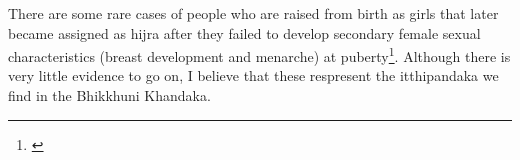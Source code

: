 There are some rare cases of people who are raised from birth as girls that later became assigned as hijra after they failed to develop secondary female sexual characteristics (breast development and menarche) at puberty\footnote{\cite{nanda}}. Although there is very little evidence to go on, I believe that these respresent the itthipandaka we find in the Bhikkhuni Khandaka.
